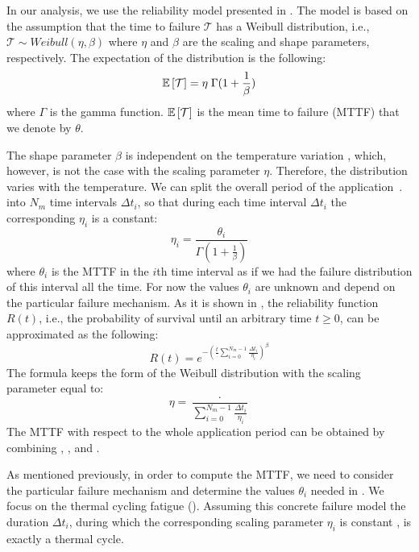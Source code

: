 \balance
In our analysis, we use the reliability model presented in \cite{huang2009, xiang2010}. The model is based on the assumption that the time to failure $\mathcal{T}$ has a Weibull distribution, i.e., $\mathcal{T} \sim Weibull(\eta, \beta)$ where $\eta$ and $\beta$ are the scaling and shape parameters, respectively. The expectation of the distribution is the following:
\begin{equation} \label{eq:general-mttf}
  \mathbb{E}\left[ \mathcal{T} \right] = \eta \; \Gamma(1 + \frac{1}{\beta})
\end{equation}
where $\Gamma$ is the gamma function. $\mathbb{E}\left[ \mathcal{T} \right]$ is the mean time to failure (MTTF) that we denote by $\theta$.

The shape parameter $\beta$ is independent on the temperature variation \cite{chang2006}, which, however, is not the case with the scaling parameter $\eta$. Therefore, the distribution varies with the temperature. We can split the overall period of the application $\period$ into $N_m$ time intervals $\Delta t_i$, so that during each time interval $\Delta t_i$ the corresponding $\eta_i$ is a constant:
\begin{equation} \label{eq:eta-one}
  \eta_i = \frac{\theta_i}{\Gamma(1 + \frac{1}{\beta})}
\end{equation}
where $\theta_i$ is the MTTF in the $i$th time interval as if we had the failure distribution of this interval all the time. For now the values $\theta_i$ are unknown and depend on the particular failure mechanism. As it is shown in \cite{xiang2010}, the reliability function $R(t)$, i.e., the probability of survival until an arbitrary time $t \geq 0$, can be approximated as the following:
\[
  R(t) = e^{-(\frac{t}{\period} \sum_{i=0}^{N_m - 1} \frac{\Delta t_i}{\eta_i})^\beta}
\]
The formula keeps the form of the Weibull distribution with the scaling parameter equal to:
\begin{equation} \label{eq:eta-many}
  \eta = \frac{\period}{\sum_{i=0}^{N_m - 1} \frac{\Delta t_i}{\eta_i}}
\end{equation}
The MTTF with respect to the whole application period can be obtained by combining , , and .

As mentioned previously, in order to compute the MTTF, we need to consider the particular failure mechanism and determine the values $\theta_i$ needed in . We focus on the thermal cycling fatigue (). Assuming this concrete failure model the duration $\Delta t_i$, during which the corresponding scaling parameter $\eta_i$ is constant , is exactly a thermal cycle.

